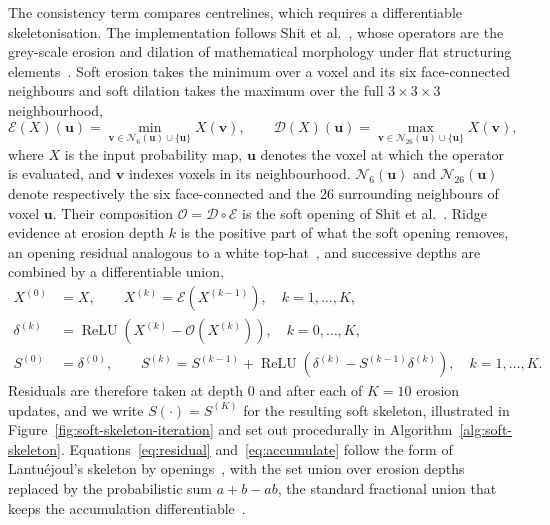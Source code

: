 The consistency term compares centrelines, which requires a differentiable skeletonisation. The
implementation follows Shit et al.~\cite{shit2021cldice}, whose operators are the grey-scale
erosion and dilation of mathematical morphology under flat structuring
elements~\cite{serra1982morphology,haralick1987morphology,soille2003morphology}. Soft erosion
takes the minimum over a voxel and its six face-connected neighbours and soft dilation takes the
maximum over the full $3\times3\times3$ neighbourhood,
\begin{equation}
  \mathcal{E}(X)(\mathbf{u})=\!\!\min_{\mathbf{v}\in\mathcal{N}_6(\mathbf{u})\cup\{\mathbf{u}\}}\!\!X(\mathbf{v}),
  \qquad
  \mathcal{D}(X)(\mathbf{u})=\!\!\max_{\mathbf{v}\in\mathcal{N}_{26}(\mathbf{u})\cup\{\mathbf{u}\}}\!\!X(\mathbf{v}),
  \label{eq:morph}
\end{equation}
where $X$ is the input probability map, $\mathbf{u}$ denotes the voxel at which the operator
is evaluated, and $\mathbf{v}$ indexes voxels in its neighbourhood. 
$\mathcal{N}_6(\mathbf{u})$ and $\mathcal{N}_{26}(\mathbf{u})$ denote respectively the six
face-connected and the 26 surrounding neighbours of voxel $\mathbf{u}$.
Their composition $\mathcal{O}=\mathcal{D}\circ\mathcal{E}$ is the soft opening
of Shit et al.~\cite{shit2021cldice}. Ridge evidence at erosion depth $k$ is the positive part of what
the soft opening removes, an opening residual analogous to a white
top-hat~\cite{soille2003morphology}, and successive depths are combined by a differentiable
union,
\begin{align}
  X^{(0)}&=X,
  \qquad
  X^{(k)}=\mathcal{E}\!\left(X^{(k-1)}\right),
  \quad k=1,\dots,K,
  \nonumber\\
  \delta^{(k)}&=\operatorname{ReLU}\!\left(X^{(k)}-\mathcal{O}\!\left(X^{(k)}\right)\right),
  \quad k=0,\dots,K,
  \label{eq:residual}\\
  S^{(0)}&=\delta^{(0)},
  \qquad
  S^{(k)}=S^{(k-1)}+\operatorname{ReLU}\!\left(\delta^{(k)}-S^{(k-1)}\delta^{(k)}\right),
  \quad k=1,\dots,K.
  \label{eq:accumulate}
\end{align}
Residuals are therefore taken at depth $0$ and after each of $K=10$ erosion updates, and we
write $S(\cdot)=S^{(K)}$ for the resulting soft skeleton, illustrated in
Figure~\ref{fig:soft-skeleton-iteration} and set out procedurally in
Algorithm~\ref{alg:soft-skeleton}. Equations~\eqref{eq:residual} and~\eqref{eq:accumulate}
follow the form of Lantu\'ejoul's skeleton by
openings~\cite{lantuejoul1980skeleton,serra1982morphology}, with the set union over erosion
depths replaced by the probabilistic sum $a+b-ab$, the standard fractional union that keeps the
accumulation differentiable~\cite{klir1995fuzzy,bloch1995fuzzymorphology}.

